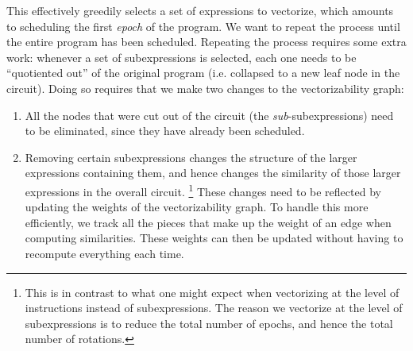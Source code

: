 This effectively greedily selects a set of expressions to vectorize, which amounts to scheduling the first {\em epoch} of the program. We want to repeat the process until the entire program has been scheduled.
Repeating the process requires some extra work: whenever a set of subexpressions is selected, each one needs to be ``quotiented out'' of the original program (i.e. collapsed to a new leaf node in the circuit).
Doing so requires that we make two changes to the vectorizability graph:
\begin{enumerate}
    \item All the nodes that were cut out of the circuit (the {\em sub}-subexpressions) need to be eliminated, since they have already been scheduled.
    \item Removing certain subexpressions changes the structure of the larger expressions containing them, and hence changes the similarity of those larger  expressions in the overall circuit. \footnote{This is in contrast to what one might expect when vectorizing at the level of instructions instead of subexpressions. The reason we vectorize at the level of subexpressions is to reduce the total number of epochs, and hence the total number of rotations.} These changes need to be reflected by updating the weights of the vectorizability graph. To handle this more efficiently, we track all the pieces that make up the weight of an edge when computing similarities. These weights can then be updated without having to recompute everything each time. 
\end{enumerate}

